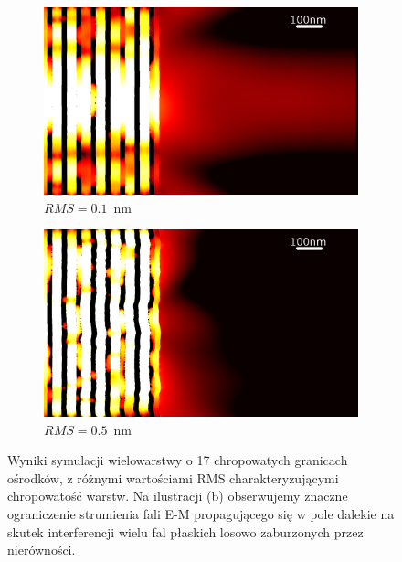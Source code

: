 \begin{figure}
	\centering
	\begin{subfigure}[b]{.45\textwidth}
		\includegraphics[width=\textwidth]{images/multilayer/oer-rms01.png}
		\caption{$RMS=0.1$~nm}
	\end{subfigure}
	\begin{subfigure}[b]{.45\textwidth}
		\includegraphics[width=\textwidth]{images/multilayer/oer-rms05.png}
		\caption{$RMS=0.5$~nm}
	\end{subfigure}
	\caption{Wyniki symulacji wielowarstwy o 17 chropowatych granicach ośrodków, z różnymi wartościami RMS charakteryzującymi chropowatość warstw. Na ilustracji (b) obserwujemy znaczne ograniczenie strumienia fali E-M propagującego się w pole dalekie na skutek interferencji wielu fal płaskich losowo zaburzonych przez nierówności.~\cite{pastuszczak2013engineering} }
\end{figure}

